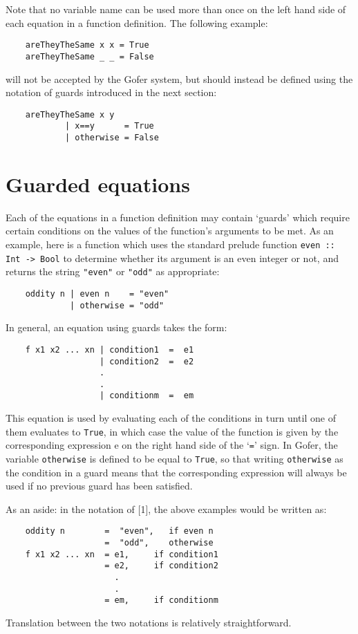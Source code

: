 Note that no variable name can be used more than once on the left  hand
side of each equation in a function definition.  The following example:
\begin{verbatim}
    areTheyTheSame x x = True 
    areTheyTheSame _ _ = False 
\end{verbatim}
will not be accepted by the Gofer system, but should instead be defined
using the notation of guards introduced in the next section:
\begin{verbatim}
    areTheyTheSame x y
            | x==y      = True
            | otherwise = False
\end{verbatim}

\section{Guarded equations}
Each of the equations in a function  definition  may  contain  `guards'
which require certain conditions  on  the  values  of  the  function's
arguments to be met.  As an example, here is a function which uses  the
standard prelude function \verb"even :: Int -> Bool" to determine whether  its
argument is an even integer or not, and returns the  string  
\verb="even"=  or
\verb="odd"= as appropriate:
\begin{verbatim}
    oddity n | even n    = "even"
             | otherwise = "odd"
\end{verbatim}
In general, an equation using guards takes the form:
\begin{verbatim}
    f x1 x2 ... xn | condition1  =  e1
                   | condition2  =  e2
                   .
                   . 
                   | conditionm  =  em
\end{verbatim}
This equation is used by evaluating each  of  the  conditions  in  turn
until one of them evaluates to \verb"True", in which case the value  of  the
function is given by the corresponding expression e on the  right  hand
side of the `\verb"="' sign.  In Gofer, the variable 
\verb"otherwise" is defined to
be equal to 
\verb"True", so that writing 
\verb"otherwise" as the condition  in  a
guard means that the corresponding expression will always be used if no
previous guard has been satisfied.

As an aside: in the notation of [1], the above examples would be written as:
\begin{verbatim}
    oddity n        =  "even",   if even n
                    =  "odd",    otherwise
    f x1 x2 ... xn  = e1,     if condition1
                    = e2,     if condition2
                      .
                      .
                    = em,     if conditionm
\end{verbatim}
Translation between the two notations is relatively straightforward.


